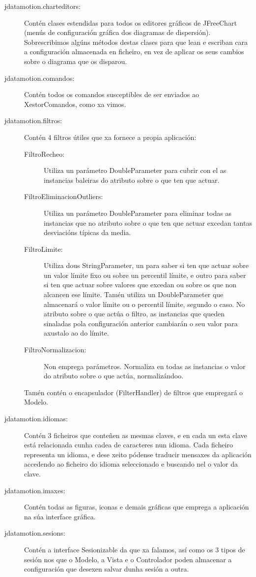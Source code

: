 \begin{description}
\item[jdatamotion.charteditors:] \hfill
Contén clases estendidas para todos os editores gráficos de JFreeChart (menús de configuración gráfica dos diagramas de dispersión). Sobrescribimos algúns métodos destas clases para que lean e escriban cara a configuración almacenada en ficheiro, en vez de aplicar os seus cambios sobre o diagrama que os disparou. 
\item[jdatamotion.comandos:]
Contén todos os comandos susceptibles de ser enviados ao XestorComandos, como xa vimos.
\item[jdatamotion.filtros:]
Contén 4 filtros útiles que xa fornece a propia aplicación:
\begin{description}
\item[FiltroRecheo:] \hfill
Utiliza un parámetro DoubleParameter para cubrir con el as instancias baleiras do atributo sobre o que ten que actuar.
\item[FiltroEliminacionOutliers:] \hfill
Utiliza un parámetro DoubleParameter para eliminar todas as instancias que no atributo sobre o que ten que actuar excedan tantas desviacións típicas da media.
\item[FiltroLimite:] \hfill
Utiliza dous StringParameter, un para saber si ten que actuar sobre un valor límite fixo ou sobre un percentil límite, e outro para saber si ten que actuar sobre valores que excedan ou sobre os que non alcancen ese límite. Tamén utiliza un DoubleParameter que almacenará o valor límite ou o percentil límite, segundo o caso. No atributo sobre o que actúa o filtro, as instancias que queden sinaladas pola configuración anterior cambiarán o seu valor para axustalo ao do límite.
\item[FiltroNormalizacion:] \hfill
Non emprega parámetros. Normaliza en todas as instancias o valor do atributo sobre o que actúa, normalizándoo.
\end{description}
Tamén contén o encapsulador (FilterHandler) de filtros que empregará o Modelo.
\item[jdatamotion.idiomas:]
Contén 3 ficheiros que conteñen as mesmas claves, e en cada un esta clave está relacionada cunha cadea de caracteres nun idioma. Cada ficheiro representa un idioma, e dese xeito pódense traducir mensaxes da aplicación accedendo ao ficheiro do idioma seleccionado e buscando nel o valor da clave.
\item[jdatamotion.imaxes:]
Contén todas as figuras, iconas e demais gráficas que emprega a aplicación na súa interface gráfica.
\item[jdatamotion.sesions:]
Contén a interface Sesionizable da que xa falamos, así como os 3 tipos de sesión nos que o Modelo, a Vista e o Controlador poden almacenar a configuración que desexen salvar dunha sesión a outra.
\end{description}

